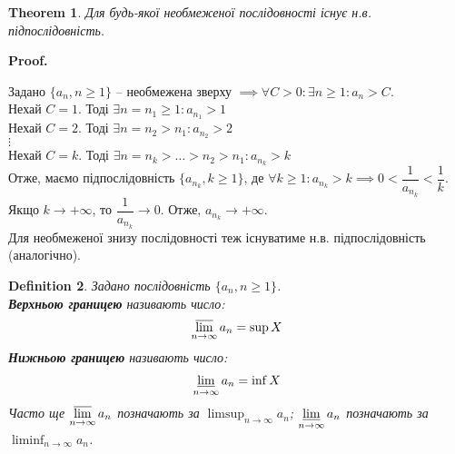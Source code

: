 \documentclass[a4paper, 14pt]{article}
\makeatletter
\def\qed{$\blacksquare$}
\theoremstyle{theoremdd}
\newtheorem{theorem}{Theorem}[subsection]
\theoremstyle{theoremdd}
\newtheorem{definition}[theorem]{Definition}
\theoremstyle{theoremdd}
\theoremstyle{theoremdd}
\theoremstyle{theoremdd}
\theoremstyle{theoremdd}
\theoremstyle{theoremdd}
\theoremstyle{theoremdd}
\renewenvironment{proof}[1][Proof.\\]{\par
\pushQED{\hfill \qed}%
\normalfont \topsep6\p@\@plus6\p@\relax
\trivlist
\item\relax
{\bfseries
#1\@addpunct{.}}\hspace\labelsep\ignorespaces
}{%
\popQED\endtrivlist\@endpefalse
}
\makeatother
\begin{document}
	\begin{theorem} Для будь-якої необмеженої послідовності існує н.в. підпослідовність.
	\end{theorem}
	
	\begin{proof}
	Задано $\{a_n, n \geq 1\}$ -- необмежена зверху $\implies \forall C > 0: \exists n \geq 1: a_n > C$.\\
	Нехай $C = 1$. Тоді $\exists n = n_1 \geq 1: a_{n_1} > 1$\\
	Нехай $C = 2$. Тоді $\exists n = n_2 > n_1: a_{n_2} > 2$\\
	$\vdots$\\
	Нехай $C = k$. Тоді $\exists n = n_k > \dots > n_2 > n_1: a_{n_k} > k$\\
	Отже, маємо підпослідовність $\{a_{n_k}, k \geq 1\}$, де $\forall k \geq 1: a_{n_k} > k \implies 0 <\dfrac{1}{a_{n_k}} < \dfrac{1}{k}$. Якщо $k \to +\infty$, то $\dfrac{1}{a_{n_k}} \to 0$. Отже, $a_{n_k} \to +\infty$.\bigskip \\
	Для необмеженої знизу послідовності теж існуватиме н.в. підпослідовність (аналогічно).
	\end{proof}
	
	\begin{definition} Задано послідовність $\{a_n, n \geq 1\}$.\\
	\textbf{Верхньою границею} називають число:
	\begin{align*}
	\displaystyle \varlimsup_{n \to \infty} a_n = \sup X
	\end{align*}
	\textbf{Нижньою границею} називають число:
	\begin{align*}
	\displaystyle \varliminf_{n \to \infty} a_n = \inf X
	\end{align*}
	Часто ще $\displaystyle\varlimsup_{n \to \infty} a_n$ позначають за $\displaystyle\limsup_{n \to \infty} a_n$; $\displaystyle\varliminf_{n \to \infty} a_n$ позначають за $\displaystyle\liminf_{n \to \infty} a_n$.
	\end{definition}
	
\end{document}
